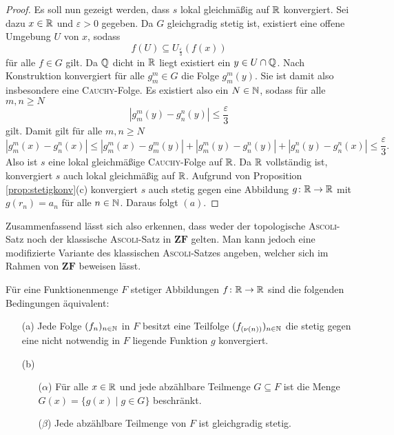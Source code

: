 \begin{proof}
  Es soll nun gezeigt werden, dass $s$ lokal gleichmäßig auf $\mathbb{R}$ konvergiert.
  Sei dazu $x \in \mathbb{R}$ und $\varepsilon > 0$ gegeben.
  Da $G$ gleichgradig stetig ist, existiert eine offene Umgebung $U$ von $x$, sodass
  \begin{displaymath}
    f(U) \subseteq U_\frac{\varepsilon}{3}(f(x))
  \end{displaymath}
  für alle $f \in G$ gilt.
  Da $\mathbb{Q}$ dicht in $\mathbb{R}$ liegt existiert ein $y \in U \cap \mathbb{Q}$.
  Nach Konstruktion konvergiert für alle $g_m^m \in G$ die Folge $g_m^m(y)$.
  Sie ist damit also insbesondere eine \textsc{Cauchy}\hyp{}Folge.
  Es existiert also ein $N \in \mathbb{N}$, sodass für alle $m,n \geq N$
  \begin{displaymath}
    | g_m^m(y) - g_n^n(y) | \leq \frac{\varepsilon}{3}
  \end{displaymath}
  gilt.
  Damit gilt für alle $m, n \geq N$
  \begin{displaymath}
    | g_m^m(x) - g_n^n(x) |
    \leq 
    | g_m^m(x) - g_m^m(y) | +  | g_m^m(y) - g_n^n(y) | +  | g_n^n(y) - g_n^n(x) |
    \leq
    \frac{\varepsilon}{3}.
  \end{displaymath}
  Also ist $s$ eine lokal gleichmäßige \textsc{Cauchy}\hyp{}Folge auf $\mathbb{R}$.
  Da $\mathbb{R}$ vollständig ist, konvergiert $s$ auch lokal gleichmäßig auf $\mathbb{R}$. 
  Aufgrund von Proposition \ref{prop:stetigkonv}(c) konvergiert $s$ auch stetig gegen eine Abbildung $g \colon \mathbb{R} \to \mathbb{R}$ mit $g(r_n) = a_n$ für alle $n \in \mathbb{N}$.
  Daraus folgt $(a)$.
\end{proof}

Zusammenfassend lässt sich also erkennen, dass weder der topologische \textsc{Ascoli}\hyp{}Satz noch der klassische \textsc{Ascoli}\hyp{}Satz in $\mathbf{ZF}$ gelten. Man kann jedoch eine modifizierte Variante des klassischen \textsc{Ascoli}\hyp{}Satzes angeben, welcher sich im Rahmen von $\mathbf{ZF}$ beweisen lässt.

\begin{thm}
  Für eine Funktionenmenge $F$ stetiger Abbildungen $f \colon \mathbb{R} \to \mathbb{R}$ sind die folgenden Bedingungen äquivalent:
  \begin{itemize}
    \item[(a)] Jede Folge $(f_n)_{n \in \mathbb{N}}$ in $F$ besitzt eine Teilfolge $(f_{(\nu(n))})_{n \in \mathbb{N}}$ die stetig gegen eine nicht notwendig in $F$ liegende Funktion $g$ konvergiert.

    \item[(b)]
      \begin{itemize}
        \item[($\alpha$)] Für alle $x \in \mathbb{R}$ und jede abzählbare Teilmenge $G \subseteq F$ ist die Menge $G(x) = \{ g(x) \mid g \in G \}$ beschränkt.
        \item[($\beta$)] Jede abzählbare Teilmenge von $F$ ist gleichgradig stetig.
      \end{itemize}
  \end{itemize}
\end{thm}

